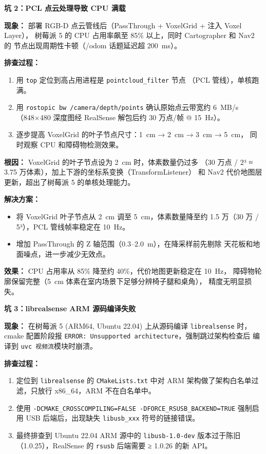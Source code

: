 \documentclass[11pt,a4paper]{article}
\begin{document}
\textbf{坑 2：PCL 点云处理导致 CPU 满载}

\textbf{现象：}
部署 RGB-D 点云管线后（PassThrough + VoxelGrid + 注入 Voxel Layer），
树莓派 5 的 CPU 占用率飙至 85\% 以上，同时 Cartographer 和 Nav2 的
节点出现周期性卡顿（/odom 话题延迟超 200~ms）。

\textbf{排查过程：}
\begin{enumerate}
  \item 用 \texttt{top} 定位到高占用进程是 \texttt{pointcloud\_filter} 节点
        （PCL 管线），单核跑满。
  \item 用 \texttt{rostopic bw /camera/depth/points} 确认原始点云带宽约
        6~MB/s（848×480 深度图经 RealSense 解包后约 30 万点/帧 @ 15~Hz）。
  \item 逐步提高 VoxelGrid 的叶子节点尺寸：1~cm → 2~cm → 3~cm → 5~cm，
        同时观察 CPU 和障碍物检测效果。
\end{enumerate}

\textbf{根因：}
VoxelGrid 的叶子节点设为 2~cm 时，体素数量仍过多
（30 万点 / 2³ ≈ 3.75 万体素），加上下游的坐标系变换（TransformListener）
和 Nav2 代价地图层更新，超出了树莓派 5 的单核处理能力。

\textbf{解决方案：}
\begin{itemize}
  \item 将 VoxelGrid 叶子节点从 2~cm 调至 5~cm，体素数量降至约
        1.5 万（30 万 / 5³），PCL 管线帧率稳定在 10~Hz。
  \item 增加 PassThrough 的 Z 轴范围（0.3--2.0~m），在降采样前先剔除
        天花板和地面噪点，进一步减少无效点。
\end{itemize}

\textbf{效果：}
CPU 占用率从 85\% 降至约 40\%，代价地图更新稳定在 10~Hz，
障碍物轮廓保留完整（5~cm 体素在室内场景下足够分辨椅子腿和桌角），
精度无明显损失。

\vspace{2em}

\textbf{坑 3：librealsense ARM 源码编译失败}

\textbf{现象：}
在树莓派 5 (ARM64, Ubuntu 22.04) 上从源码编译 \texttt{librealsense} 时，
cmake 配置阶段报 \texttt{ERROR: Unsupported architecture}，强制跳过架构检查后
编译到 \texttt{uvc 视频流}模块时崩溃。

\textbf{排查过程：}
\begin{enumerate}
  \item 定位到 \texttt{librealsense} 的 \texttt{CMakeLists.txt} 中对 ARM
        架构做了架构白名单过滤，只放行 x86\_64，ARM 不在白名单中。
  \item 使用 \texttt{-DCMAKE\_CROSSCOMPILING=FALSE -DFORCE\_RSUSB\_BACKEND=TRUE}
        强制启用 USB 后端后，出现缺失 \texttt{libusb\_xxx} 符号的链接错误。
  \item 最终排查到 Ubuntu 22.04 ARM 源中的 \texttt{libusb-1.0-dev} 版本过于陈旧
        （1.0.25），RealSense 的 \texttt{rsusb} 后端需要 ≥ 1.0.26 的新 API。
\end{enumerate}
\end{document}
